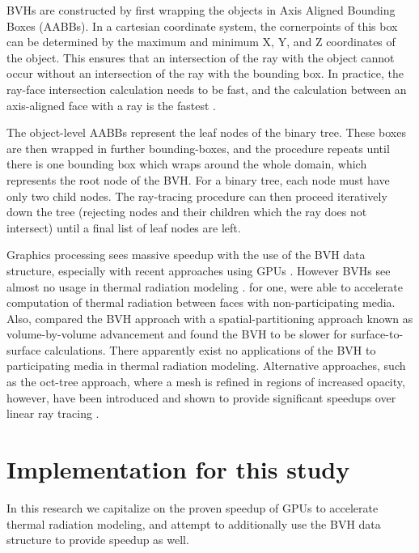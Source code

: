 BVHs are constructed by first wrapping the objects in Axis Aligned Bounding Boxes (AABBs). In a cartesian coordinate system, the cornerpoints of this box can be determined by the maximum and minimum X, Y, and Z coordinates of the object.
This ensures that an intersection of the ray with the object cannot occur without an intersection of the ray with the bounding box. 
In practice, the ray-face intersection calculation needs to be fast, and the calculation between an axis-aligned face with a ray is the fastest \cite{Kay1986RayScenes}.

The object-level AABBs represent the leaf nodes of the binary tree. These boxes are then wrapped in further bounding-boxes, and the procedure repeats until there is one bounding box which wraps around the whole domain, which represents the root node of the BVH. 
For a binary tree, each node must have only two child nodes. The ray-tracing procedure can then proceed iteratively down the tree (rejecting nodes and their children which the ray does not intersect) until a final list of leaf nodes are left.

Graphics processing sees massive speedup with the use of the BVH data structure, especially with recent approaches using GPUs \cite{Nery2013ParallelGPGPUs,Meister2021ATracing,Karras2012MaximizingTrees}.
However BVHs see almost no usage in thermal radiation modeling \cite{Liu2020TheFlames}.
\citet{Kuczynskia2014RadiationBoundaries} for one, were able to accelerate computation of thermal radiation between faces with non-participating media. 
Also, \citet{Mazumder2006MethodsTransport} compared the BVH approach with a spatial-partitioning approach known as volume-by-volume advancement and found the BVH to be slower for surface-to-surface calculations. 
There apparently exist no applications of the BVH to participating media in thermal radiation modeling. Alternative approaches, such as the oct-tree approach, where a mesh is refined in regions of increased opacity, however, have been introduced and shown to provide significant speedups over linear ray tracing \cite{Saftly2013UsingNote}.

\section{Implementation for this study}
In this research we capitalize on the proven speedup of GPUs to accelerate thermal radiation modeling, and attempt to additionally use the BVH data structure to provide speedup as well.

